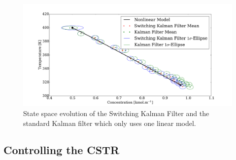 \documentclass[../masters.tex]{subfiles}
\begin{document}
\begin{figure}[H] 
\centering
\includegraphics[scale=0.3]{skf_s7_p_m2.pdf}
\caption{State space evolution of the Switching Kalman Filter and the standard Kalman filter which only uses one linear model.}
\label{fig_7mod_p_m2}
\end{figure}









\subsection{Controlling the CSTR}




\end{document}
